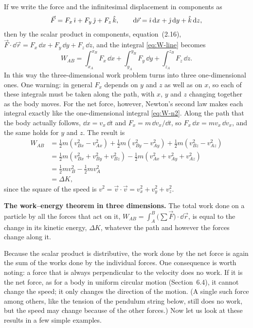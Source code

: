 \documentclass[11pt,a4paper]{article}
\begin{document}
If we write the force and the infinitesimal displacement in components as
\begin{equation}\label{eq:F-dr-comp}
  \vec{F} = F_x\,\hat{\imath} + F_y\,\hat{\jmath} + F_z\,\hat{k} , \qquad
  \mathrm{d}\vec{r} = \hat{\imath}\,\mathrm{d} x + \hat{\jmath}\,\mathrm{d} y + \hat{k}\,\mathrm{d} z ,
\end{equation}
then by the scalar product in components, equation~(2.16),
$\vec{F}\cdot\dd\vec{r} = F_x\,\dd x + F_y\,\dd y + F_z\,\dd z$, and the integral \eqref{eq:W-line}
becomes
\begin{equation}\label{eq:W-xyz}
  W_{AB} = \int_{x_A}^{x_B} F_x\,\dd x + \int_{y_A}^{y_B} F_y\,\dd y + \int_{z_A}^{z_B} F_z\,\dd z .
\end{equation}
In this way the three-dimensional work problem turns into three one-dimensional ones. One warning: in
general $F_x$ depends on $y$ and $z$ as well as on $x$, so each of these integrals must be taken along
the path, with $x$, $y$ and $z$ changing together as the body moves. For the net force, however,
Newton's second law makes each integral exactly like the one-dimensional integral \eqref{eq:W-n2}.
Along the path that the body actually follows, $\dd x = v_x\,\dd t$ and $F_x = m\,\dd v_x/\dd t$, so
$F_x\,\dd x = mv_x\,\dd v_x$, and the same holds for $y$ and $z$. The result is
\begin{equation}\label{eq:wke-3d}
\begin{split}
  W_{AB} &= \frac12 m(v_{Bx}^2 - v_{Ax}^2) + \frac12 m(v_{By}^2 - v_{Ay}^2)
            + \frac12 m(v_{Bz}^2 - v_{Az}^2) \\
         &= \frac12 m(v_{Bx}^2 + v_{By}^2 + v_{Bz}^2) - \frac12 m(v_{Ax}^2 + v_{Ay}^2 + v_{Az}^2) \\
         &= \frac12 mv_B^2 - \frac12 mv_A^2 \\
         &= \Delta K ,
\end{split}
\end{equation}
since the square of the speed is $v^2 = \vec{v}\cdot\vec{v} = v_x^2 + v_y^2 + v_z^2$.
\begin{keyresult}
\textbf{The work--energy theorem in three dimensions.} The total work done on a particle by all the forces that act on it, $W_{AB} = \int_A^B
\bigl(\sum\vec{F}\bigr)\cdot\dd\vec{r}$, is equal to the change in its kinetic energy, $\Delta K$,
whatever the path and however the forces change along it.
\end{keyresult}
Because the scalar product is distributive, the work done by the net force is again the sum of the
works done by the individual forces. One consequence is worth noting: a force that is always
perpendicular to the velocity does no work. If it is the net force, as for a body in uniform circular
motion (Section~6.4), it cannot change the speed; it only changes the direction of the motion. (A
single such force among others, like the tension of the pendulum string below, still does no work,
but the speed may change because of the other forces.) Now let us look at these results in a few simple examples.
\end{document}
